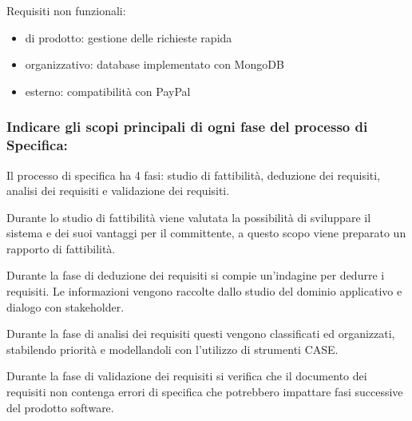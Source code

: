 \documentclass[11pt]{article}
\begin{document}
Requisiti non funzionali:
\begin{itemize}
    \item di prodotto: gestione delle richieste rapida
    \item organizzativo: database implementato con MongoDB 
    \item esterno: compatibilità con PayPal
\end{itemize}
\subsubsection*{Indicare gli scopi principali di ogni fase del processo di Specifica:}
Il processo di specifica ha 4 fasi: studio di fattibilità, deduzione dei requisiti, analisi dei requisiti e validazione 
dei requisiti.

Durante lo studio di fattibilità viene valutata la possibilità di sviluppare il sistema e dei suoi vantaggi per il committente,
a questo scopo viene preparato un rapporto di fattibilità.

Durante la fase di deduzione dei requisiti si compie un'indagine per dedurre i requisiti. Le informazioni vengono raccolte 
dallo studio del dominio applicativo e dialogo con stakeholder.

Durante la fase di analisi dei requisiti questi vengono classificati ed organizzati, stabilendo priorità e modellandoli 
con l'utilizzo di strumenti CASE.

Durante la fase di validazione dei requisiti si verifica che il documento dei requisiti non contenga errori di specifica 
che potrebbero impattare fasi successive del prodotto software.
\end{document}
